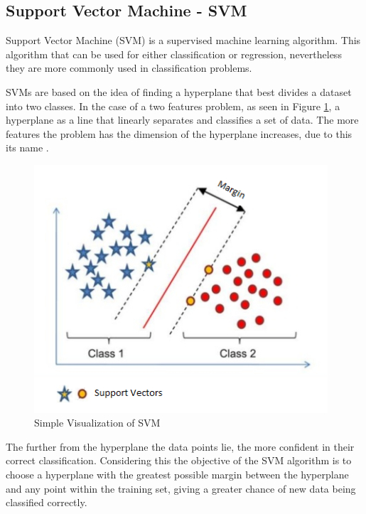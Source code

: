 \documentclass[a4paper,10pt,english]{article}
\begin{document}
        \vspace{20pt}
        
        \subsection{Support Vector Machine - SVM}
        
        Support Vector Machine (SVM) \cite{SVM:Cortes1995} is a supervised machine learning algorithm. This algorithm that can be used for either classification or regression, nevertheless they are more commonly used in classification problems.
        
        SVMs are based on the idea of finding a hyperplane that best divides a dataset into two classes. In the case of a two features problem, as seen in Figure \ref{fig:svm_simple}, a hyperplane as a line that linearly separates and classifies a set of data. The more features the problem has the dimension of the hyperplane increases, due to this its name \cite{SVM:Wiki}.
    
        \begin{figure}[h!]
            \centering
            \includegraphics[width=310pt]{images/svm_simple}
            \caption{Simple Visualization of SVM} \label{fig:svm_simple}
        \end{figure}
    
        The further from the hyperplane the  data points lie, the more confident in their correct classification. Considering this the objective of the SVM algorithm is to choose a hyperplane with the greatest possible margin between the hyperplane and any point within the training set, giving a greater chance of new data being classified correctly.
        
\end{document}
